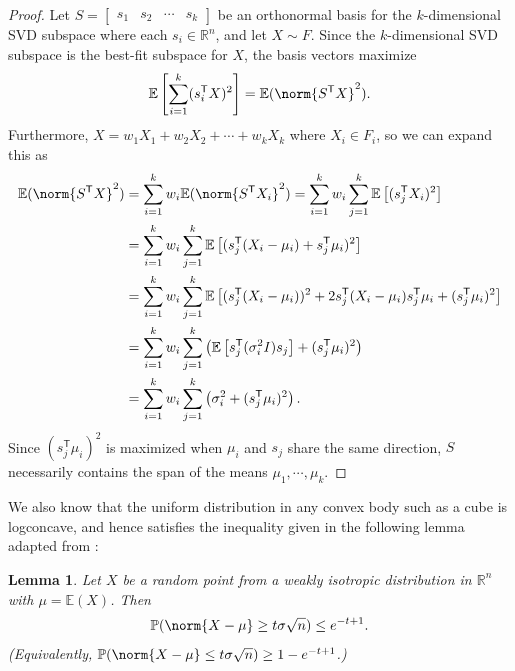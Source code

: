 \documentclass[a4paper,12pt]{article}
\newtheorem{lemma}[theorem]{Lemma}
\theoremstyle{remark}
\newcommand{\transpose}{\mathsf{T}}
\begin{document}
    \begin{proof}
        Let $S = \left[ \begin{array}{cccc} s_1 & s_2 & \cdots & s_k \end{array} \right]$ be an orthonormal basis for the $k$-dimensional SVD subspace where each $s_i \in \mathbb{R}^n$, and let $X \sim F$. Since the $k$-dimensional SVD subspace is the best-fit subspace for $X$, the basis vectors maximize
        \begin{align*}
            \mathbb{E} \left[ \sum_{i = 1}^k (s_i^\transpose X)^2 \right] = \mathbb{E}(\norm{S^\transpose X}^2).
        \end{align*}
        Furthermore, $X = w_1 X_1 + w_2 X_2 + \cdots + w_k X_k$ where $X_i \in F_i$, so we can expand this as
        \begin{align*}
            \mathbb{E}(\norm{S^\transpose X}^2) &= \sum_{i = 1}^k w_i \mathbb{E}(\norm{S^\transpose X_i}^2) = \sum_{i = 1}^k w_i \sum_{j = 1}^k \mathbb{E} \left[ (s_j^\transpose X_i)^2 \right] \\
            &= \sum_{i = 1}^k w_i \sum_{j = 1}^k \mathbb{E} \left[ (s_j^\transpose (X_i - \mu_i) + s_j^\transpose \mu_i)^2 \right] \\
            &= \sum_{i = 1}^k w_i \sum_{j = 1}^k \mathbb{E} \left[ (s_j^\transpose (X_i - \mu_i))^2 + 2s_j^\transpose (X_i - \mu_i) s_j^\transpose \mu_i + (s_j^\transpose \mu_i)^2 \right] \\
            &= \sum_{i = 1}^k w_i \sum_{j = 1}^k \left( \mathbb{E} \left[ s_j^\transpose (\sigma_i^2 I) s_j \right] + (s_j^\transpose \mu_i)^2 \right) \\
            &= \sum_{i = 1}^k w_i \sum_{j = 1}^k \left( \sigma_i^2 + (s_j^\transpose \mu_i)^2 \right).
        \end{align*}
        Since $(s_j^\transpose \mu_i)^2$ is maximized when $\mu_i$ and $s_j$ share the same direction, $S$ necessarily contains the span of the means $\mu_1, \cdots, \mu_k$.
    \end{proof}
    We also know that the uniform distribution in any convex body such as a cube is logconcave, and hence satisfies the inequality given in the following lemma adapted from \cite{spectral}:
    \begin{lemma}
        Let $X$ be a random point from a weakly isotropic distribution in $\mathbb{R}^n$ with $\mu = \mathbb{E}(X)$. Then
        \begin{align*}
            \mathbb{P}(\norm{X - \mu} \geq t\sigma\sqrt{n}) \leq e^{-t + 1}.
        \end{align*}
        (Equivalently, $\mathbb{P}(\norm{X - \mu} \leq t\sigma\sqrt{n}) \geq 1 - e^{-t + 1}$.) 
    \end{lemma}
\end{document}
